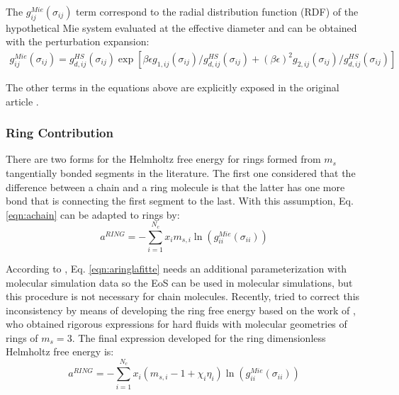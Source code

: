 The $g_{ij}^{Mie}(\sigma_{ij})$ term correspond to the radial distribution function (RDF) of the hypothetical Mie system evaluated at the effective diameter and can be obtained with the perturbation expansion:
\begin{equation}
\begin{aligned}
g_{ij}^{Mie}(\sigma_{ij}) =g_{d,ij}^{HS}(\sigma_{ij})\exp[\beta\epsilon g_{1,ij}(\sigma_{ij})/g_{d,ij}^{HS}(\sigma_{ij}) + (\beta\epsilon)^{2} g_{2,ij}(\sigma_{ij})/g_{d,ij}^{HS}(\sigma_{ij})]
\end{aligned}
\label{eqn:gmie}
\end{equation}


The other terms in the equations above are explicitly exposed in the original article \cite{lafitte2013}. 

\subsubsection{Ring Contribution}
There are two forms for the Helmholtz free energy for rings formed from $m_{s}$ tangentially bonded segments in the literature. The first one  \cite{lafitte2012} considered that the difference between a chain and a ring molecule is that the latter has one more bond that is connecting the first segment to the last. With this assumption, Eq. \eqref{eqn:achain} can be adapted to rings by:
\begin{equation}
a^{RING} =-\sum_{i=1}^{N_{c}} x_{i}m_{s,i}\ln(g_{ii}^{Mie}(\sigma_{ii}))
\label{eqn:aringlafitte}
\end{equation}

According to , Eq. \eqref{eqn:aringlafitte} needs an additional parameterization with molecular simulation data so the EoS can  be used in molecular simulations, but this procedure is not necessary for chain molecules. Recently,  tried to correct this inconsistency by means of developing the ring free energy based on the work of , who obtained rigorous expressions for hard fluids with molecular geometries of rings of $m_s=3$. The final expression developed for the ring dimensionless Helmholtz free energy is:
\begin{equation}
a^{RING} =-\sum_{i=1}^{N_{c}} x_{i}(m_{s,i}-1+\chi_{i}\eta_{i})\ln(g_{ii}^{Mie}(\sigma_{ii}))
\label{eqn:aringmuller}
\end{equation}

